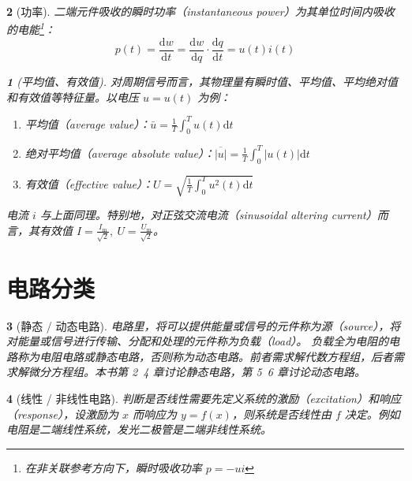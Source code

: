 \documentclass[UTF8]{report}
\theoremstyle{MyLineTheoremStyle} %
\theoremstyle{MyBlockTheoremStyle} %
\theoremstyle{MySubsubsectionStyle} %
\newtheorem{definition}{}
\begin{document}
\begin{definition}[功率]

二端元件吸收的瞬时功率（instantaneous power）为其单位时间内吸收的电能\footnote{在非关联参考方向下，瞬时吸收功率 $p = -ui$}：
\begin{equation*}
p(t) = \frac{\mathrm{d}w}{\mathrm{d}t} = \frac{\mathrm{d}w}{\mathrm{d}q}\cdot\frac{\mathrm{d}q}{\mathrm{d}t} = u(t)i(t) 
\end{equation*}


\begin{definition}[平均值、有效值]
对周期信号而言，其物理量有瞬时值、平均值、平均绝对值和有效值等特征量。以电压 $u = u(t)$ 为例：

\begin{enumerate}
\item 平均值（average value）：$\bar{u} = \frac{1}{T}\int_0^T u(t)\mathrm{d}t$
\item 绝对平均值（average absolute value）：$\overline{| u |} = \frac{1}{T}\int_0^T | u(t) |\mathrm{d}t$
\item 有效值（effective value）：$ U = \sqrt{\frac{1}{T}\int_0^T u^2(t)\mathrm{d}t} $
\end{enumerate}
电流 $i$ 与上面同理。特别地，对正弦交流电流（sinusoidal altering current）而言，其有效值 $I = \frac{I_{\mathrm{m}}}{\sqrt{2}},\ U = \frac{U_{\mathrm{m}}}{\sqrt{2}}$。
\end{definition}


\end{definition}


\section{电路分类}


\begin{definition}[静态 / 动态电路]
    电路里，将可以提供能量或信号的元件称为源（source），将对能量或信号进行传输、分配和处理的元件称为负载（load）。
    负载全为电阻的电路称为电阻电路或静态电路，否则称为动态电路。前者需求解代数方程组，后者需求解微分方程组。本书第 2~4 章讨论静态电路，第 5~6 章讨论动态电路。
\end{definition}


\begin{definition}[线性 / 非线性电路]
判断是否线性需要先定义系统的激励（excitation）和响应（response），设激励为 $x$ 而响应为 $y = f(x)$，则系统是否线性由 $f$ 决定。例如电阻是二端线性系统，发光二极管是二端非线性系统。
\end{definition}
\end{document}
